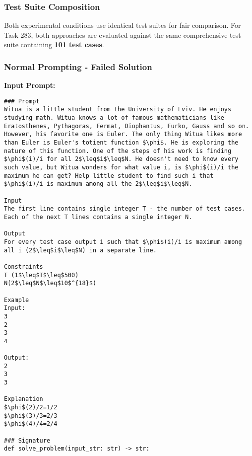 \documentclass{article}
\begin{document}
\subsubsection{Test Suite Composition}

Both experimental conditions use identical test suites for fair comparison. For Task 283, both approaches are evaluated against the same comprehensive test suite containing \textbf{101 test cases}.

\subsubsection{Normal Prompting - Failed Solution}

\textbf{Input Prompt:}
\begin{lstlisting}
### Prompt
Witua is a little student from the University of Lviv. He enjoys studying math. Witua knows a lot of famous mathematicians like Eratosthenes, Pythagoras, Fermat, Diophantus, Furko, Gauss and so on. However, his favorite one is Euler. The only thing Witua likes more than Euler is Euler's totient function $\phi$. He is exploring the nature of this function. One of the steps of his work is finding $\phi$(i)/i for all 2$\leq$i$\leq$N. He doesn't need to know every such value, but Witua wonders for what value i, is $\phi$(i)/i the maximum he can get? Help little student to find such i that $\phi$(i)/i is maximum among all the 2$\leq$i$\leq$N.

Input
The first line contains single integer T - the number of test cases. Each of the next T lines contains a single integer N.

Output
For every test case output i such that $\phi$(i)/i is maximum among all i (2$\leq$i$\leq$N) in a separate line.

Constraints
T (1$\leq$T$\leq$500)
N(2$\leq$N$\leq$10$^{18}$)

Example
Input:
3
2
3
4

Output:
2
3
3

Explanation
$\phi$(2)/2=1/2
$\phi$(3)/3=2/3
$\phi$(4)/4=2/4

### Signature
def solve_problem(input_str: str) -> str:
\end{lstlisting}
\end{document}
